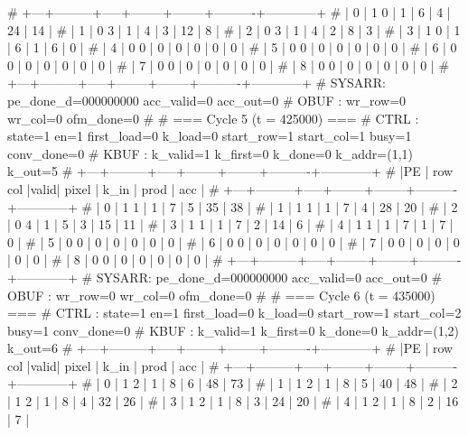 # +---+---------+-----+--------+--------+----------+------------+
# | 0 |   1   0 |  1  |      6 |      4 |       24 |         14 |
# | 1 |   0   3 |  1  |      4 |      3 |       12 |          8 |
# | 2 |   0   3 |  1  |      4 |      2 |        8 |          3 |
# | 3 |   1   0 |  1  |      6 |      1 |        6 |          0 |
# | 4 |   0   0 |  0  |      0 |      0 |        0 |          0 |
# | 5 |   0   0 |  0  |      0 |      0 |        0 |          0 |
# | 6 |   0   0 |  0  |      0 |      0 |        0 |          0 |
# | 7 |   0   0 |  0  |      0 |      0 |        0 |          0 |
# | 8 |   0   0 |  0  |      0 |      0 |        0 |          0 |
# +---+---------+-----+--------+--------+----------+------------+
# SYSARR: pe_done_d=000000000 acc_valid=0 acc_out=0
# OBUF : wr_row=0 wr_col=0 ofm_done=0
# 
# === Cycle 5  (t = 425000) ===
# CTRL : state=1 en=1 first_load=0 k_load=0 start_row=1 start_col=1 busy=1 conv_done=0
# KBUF : k_valid=1 k_first=0 k_done=0 k_addr=(1,1) k_out=5
# +---+---------+-----+--------+--------+----------+------------+
# |PE | row col |valid| pixel  |  k_in  |   prod   |    acc     |
# +---+---------+-----+--------+--------+----------+------------+
# | 0 |   1   1 |  1  |      7 |      5 |       35 |         38 |
# | 1 |   1   1 |  1  |      7 |      4 |       28 |         20 |
# | 2 |   0   4 |  1  |      5 |      3 |       15 |         11 |
# | 3 |   1   1 |  1  |      7 |      2 |       14 |          6 |
# | 4 |   1   1 |  1  |      7 |      1 |        7 |          0 |
# | 5 |   0   0 |  0  |      0 |      0 |        0 |          0 |
# | 6 |   0   0 |  0  |      0 |      0 |        0 |          0 |
# | 7 |   0   0 |  0  |      0 |      0 |        0 |          0 |
# | 8 |   0   0 |  0  |      0 |      0 |        0 |          0 |
# +---+---------+-----+--------+--------+----------+------------+
# SYSARR: pe_done_d=000000000 acc_valid=0 acc_out=0
# OBUF : wr_row=0 wr_col=0 ofm_done=0
# 
# === Cycle 6  (t = 435000) ===
# CTRL : state=1 en=1 first_load=0 k_load=0 start_row=1 start_col=2 busy=1 conv_done=0
# KBUF : k_valid=1 k_first=0 k_done=0 k_addr=(1,2) k_out=6
# +---+---------+-----+--------+--------+----------+------------+
# |PE | row col |valid| pixel  |  k_in  |   prod   |    acc     |
# +---+---------+-----+--------+--------+----------+------------+
# | 0 |   1   2 |  1  |      8 |      6 |       48 |         73 |
# | 1 |   1   2 |  1  |      8 |      5 |       40 |         48 |
# | 2 |   1   2 |  1  |      8 |      4 |       32 |         26 |
# | 3 |   1   2 |  1  |      8 |      3 |       24 |         20 |
# | 4 |   1   2 |  1  |      8 |      2 |       16 |          7 |
